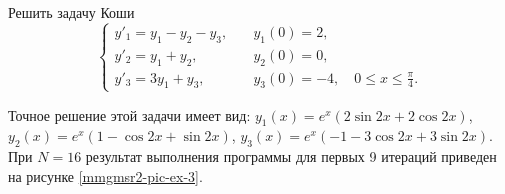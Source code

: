 \begin{example}\label{mmgmsr2-ex-3}
	Решить задачу Коши
	\begin{equation*}
	\begin{cases}
	y'_1 = y_1 - y_2 - y_3, &\quad y_1(0) = 2,\\
	y'_2 = y_1 + y_2, &\quad y_2(0) = 0,\\
	y'_3 = 3y_1 + y_3, &\quad y_3(0) = -4, \quad 0 \le x \le \frac{\pi}{4}.
	\end{cases}
	\end{equation*}
\end{example}
Точное решение этой задачи имеет вид: $y_1(x)= e^x (2\sin 2x + 2\cos 2x)$, $y_2(x)=e^x (1 - \cos 2x + \sin 2x)$, $y_3 (x) = e^x (-1 - 3\cos 2x + 3\sin 2x)$.
При $N=16$ результат выполнения программы для первых 9 итераций приведен на рисунке \ref{mmgmsr2-pic-ex-3}.

